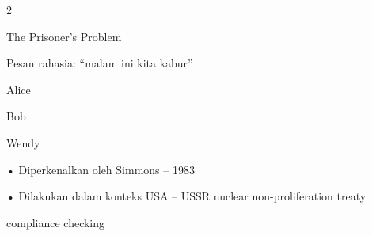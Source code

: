 \documentclass{article}
\begin{document}

2

The Prisoner’s Problem 

Pesan rahasia: “malam ini kita kabur” 

Alice

Bob

Wendy

•    Diperkenalkan oleh Simmons – 1983

•   Dilakukan dalam konteks USA – USSR nuclear non-proliferation treaty 

     compliance checking
\end{document}
